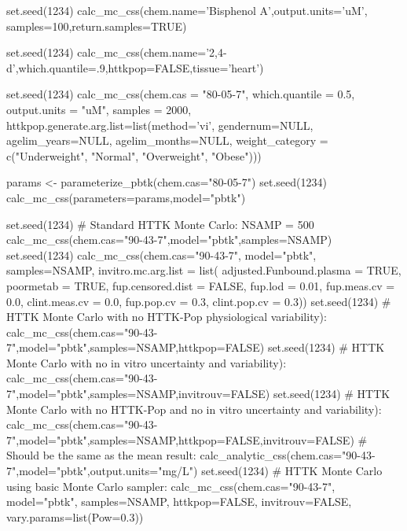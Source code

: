 \documentclass[a4paper]{book}
\begin{document}
%
\begin{Examples}
\begin{ExampleCode}


 set.seed(1234)
 calc_mc_css(chem.name='Bisphenol A',output.units='uM',
             samples=100,return.samples=TRUE)
             
 set.seed(1234)
 calc_mc_css(chem.name='2,4-d',which.quantile=.9,httkpop=FALSE,tissue='heart')

 set.seed(1234)
 calc_mc_css(chem.cas = "80-05-7", which.quantile = 0.5,
             output.units = "uM", samples = 2000,
             httkpop.generate.arg.list=list(method='vi', gendernum=NULL, 
             agelim_years=NULL, agelim_months=NULL, weight_category = 
             c("Underweight", "Normal", "Overweight", "Obese")))

 params <- parameterize_pbtk(chem.cas="80-05-7")
 set.seed(1234)
 calc_mc_css(parameters=params,model="pbtk")



 set.seed(1234)
 # Standard HTTK Monte Carlo:
 NSAMP = 500
 calc_mc_css(chem.cas="90-43-7",model="pbtk",samples=NSAMP)
 set.seed(1234)
 calc_mc_css(chem.cas="90-43-7",
 model="pbtk",
 samples=NSAMP,
 invitro.mc.arg.list = list(
   adjusted.Funbound.plasma = TRUE,
   poormetab = TRUE, 
   fup.censored.dist = FALSE, 
   fup.lod = 0.01, 
   fup.meas.cv = 0.0, 
   clint.meas.cv = 0.0, 
   fup.pop.cv = 0.3, 
   clint.pop.cv = 0.3))
 set.seed(1234)
 # HTTK Monte Carlo with no HTTK-Pop physiological variability):
 calc_mc_css(chem.cas="90-43-7",model="pbtk",samples=NSAMP,httkpop=FALSE)
 set.seed(1234)
 # HTTK Monte Carlo with no in vitro uncertainty and variability):
 calc_mc_css(chem.cas="90-43-7",model="pbtk",samples=NSAMP,invitrouv=FALSE)
 set.seed(1234)
 # HTTK Monte Carlo with no HTTK-Pop and no in vitro uncertainty and variability):
 calc_mc_css(chem.cas="90-43-7",model="pbtk",samples=NSAMP,httkpop=FALSE,invitrouv=FALSE)
 # Should be the same as the mean result:
 calc_analytic_css(chem.cas="90-43-7",model="pbtk",output.units="mg/L")
 set.seed(1234)
 # HTTK Monte Carlo using basic Monte Carlo sampler:
 calc_mc_css(chem.cas="90-43-7",
 model="pbtk",
 samples=NSAMP,
 httkpop=FALSE,
 invitrouv=FALSE,
 vary.params=list(Pow=0.3))


\end{ExampleCode}
\end{Examples}
\end{document}
